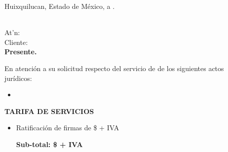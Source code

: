 \begin{flushright}
Huixquilucan, Estado de M\'exico, a \fechaCotizacion.
\end{flushright}
\vspace{1cm}

\begin{flushleft}
\textcolor{principal}{\nombreEmpresa}\\
At'n: \nombreInteresado\\
Cliente: \textcolor{principal}{\cliente}\\[1cm]

\Large\textbf{\textcolor{principal}{Presente.}}\\[1cm]
\end{flushleft}

En atenci\'on a su solicitud respecto del servicio de \textcolor{principal}{\tipoServicio} de los siguientes actos jur\'idicos:

\begin{itemize}
\item \descActos
{}

\end{itemize}

\textbf{\textcolor{principal}{TARIFA DE SERVICIOS}}
\begin{itemize}
	\item Ratificaci\'on de firmas de \actosJuridicos{}  \$\numprint[MXN]{\totalFirmas}{} + IVA\\
	
	\begin{flushright}
		\textbf{\textcolor{principal}{Sub-total: \$\numprint[MXN]{\subtotal} + IVA}}
	\end{flushright}

\end{itemize}


